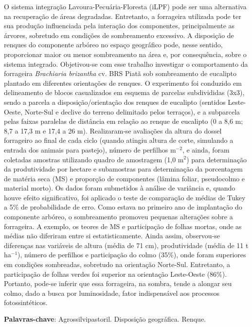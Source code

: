 \documentclass[article,12pt,onesidea,4paper,english,brazil]{abntex2}
\begin{document}
	\noindent O sistema integração Lavoura-Pecuária-Floresta (iLPF) pode ser uma alternativa na
	recuperação de áreas degradadas. Entretanto, a forrageira utilizada pode ter sua
	produção influenciada pela interação dos componentes, principalmente as árvores,
	sobretudo em condições de sombreamento excessivo. A disposição de renques do
	componente arbóreo no espaço geográfico pode, nesse sentido, proporcionar maior
	ou menor sombreamento na área e, por consequência, sobre o sistema integrado.
	Objetivou-se com esse trabalho investigar o comportamento da forrageira \textit{Brachiaria
	brizantha} cv. BRS Piatã sob sombreamento de eucalipto plantado em diferentes
	orientações de renques. O experimento foi conduzido em delineamento de blocos
	casualizados em esquema de parcelas subdivididas (3x3), sendo a parcela a
	disposição/orientação dos renques de eucalipto (sentidos Leste-Oeste, Norte-Sul e
	declive do terreno delimitado pelos terraços), e a subparcela pelas faixas paralelas
	de distância em relação ao renque de eucalipto (0 a 8,6 m; 8,7 a 17,3 m e 17,4 a 26
	m). Realizaram-se avaliações da altura do dossel forrageiro ao final de cada ciclo
	(quando atingiu altura de corte, simulando a entrada dos animais para pastejo),
	número de perfilhos m$^{-2}$, e ainda, foram coletadas amostras utilizando quadro de
	amostragem (1,0 m$^{2}$) para determinação da produtividade por hectare e
	subamostras para determinação da porcentagem de matéria seca (MS) e proporção
	de componentes (lâmina foliar, pseudocolmo e material morto). Os dados foram
	submetidos à análise de variância e, quando houve efeito significativo, foi aplicado o
	teste de comparação de médias de Tukey a 5\% de probabilidade de erro. Como
	estava no primeiro ano de implantação do componente arbóreo, o sombreamento
	promoveu pequenas alterações sobre a forrageira. A exemplo, os teores de MS e
	participação de folhas mortas, onde as médias não diferiram entre si
	estatisticamente. Ainda assim, observou-se diferenças nas variáveis de altura
	(média de 71 cm), produtividade (média de 11 t ha$^{-1}$), número de perfilhos e participação do colmo (35\%), onde foram superiores em condições sombreadas, sobretudo na orientação Norte-Sul. Entretanto, a participação de folhas verdes foi
	superior na orientação Leste-Oeste (86\%). Portanto, pode-se inferir que essa
	forrageira, na sombra, tende a alongar seu colmo, dado a busca por luminosidade,
	fator indispensável aos processos fotossintéticos.
	
	\vspace{\onelineskip}
	
	\noindent
	\textbf{Palavras-chave}: Agrossilvipastoril. Disposição geográfica. Renque.
	
\end{document}
